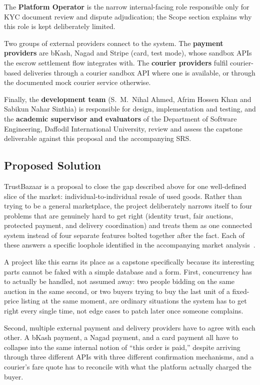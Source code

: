\documentclass[11pt,a4paper]{article}
\begin{document}
The \textbf{Platform Operator} is the narrow internal-facing role responsible only for KYC document
review and dispute adjudication; the Scope section explains why this role is kept deliberately
limited.

Two groups of external providers connect to the system. The \textbf{payment providers} are bKash,
Nagad and Stripe (card, test mode), whose sandbox APIs the escrow settlement flow integrates with. The
\textbf{courier providers} fulfil courier-based deliveries through a courier sandbox API where one is
available, or through the documented mock courier service otherwise.

Finally, the \textbf{development team} (S.\ M.\ Nihal Ahmed, Afrim Hossen Khan and Sabikun Nahar
Sinthia) is responsible for design, implementation and testing, and the \textbf{academic supervisor
and evaluators} of the Department of Software Engineering, Daffodil International University, review
and assess the capstone deliverable against this proposal and the accompanying SRS.

\subsection{Proposed Solution}

TrustBazaar is a proposal to close the gap described above for one well-defined slice of the market:
individual-to-individual resale of used goods. Rather than trying to be a general marketplace, the
project deliberately narrows itself to four problems that are genuinely hard to get right (identity
trust, fair auctions, protected payment, and delivery coordination) and treats them as one connected
system instead of four separate features bolted together after the fact. Each of these answers a
specific loophole identified in the accompanying market analysis~\cite[\S3.6, \S4]{supp}.

A project like this earns its place as a capstone specifically because its interesting parts cannot be
faked with a simple database and a form. First, concurrency has to actually be handled, not assumed
away: two people bidding on the same auction in the same second, or two buyers trying to buy the last
unit of a fixed-price listing at the same moment, are ordinary situations the system has to get right
every single time, not edge cases to patch later once someone complains.

Second, multiple external payment and delivery providers have to agree with each other. A bKash
payment, a Nagad payment, and a card payment all have to collapse into the same internal notion of
``this order is paid,'' despite arriving through three different APIs with three different confirmation
mechanisms, and a courier's fare quote has to reconcile with what the platform actually charged the
buyer.
\end{document}
